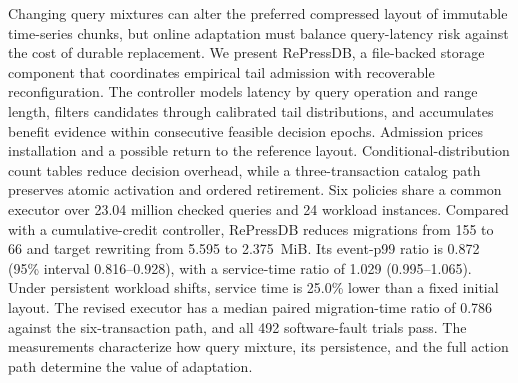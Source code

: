 Changing query mixtures can alter the preferred compressed layout of immutable time-series chunks, but online adaptation must balance query-latency risk against the cost of durable replacement. We present RePressDB, a file-backed storage component that coordinates empirical tail admission with recoverable reconfiguration. The controller models latency by query operation and range length, filters candidates through calibrated tail distributions, and accumulates benefit evidence within consecutive feasible decision epochs. Admission prices installation and a possible return to the reference layout. Conditional-distribution count tables reduce decision overhead, while a three-transaction catalog path preserves atomic activation and ordered retirement. Six policies share a common executor over 23.04 million checked queries and 24 workload instances. Compared with a cumulative-credit controller, RePressDB reduces migrations from 155 to 66 and target rewriting from 5.595 to 2.375~MiB. Its event-p99 ratio is 0.872 (95\% interval 0.816--0.928), with a service-time ratio of 1.029 (0.995--1.065). Under persistent workload shifts, service time is 25.0\% lower than a fixed initial layout. The revised executor has a median paired migration-time ratio of 0.786 against the six-transaction path, and all 492 software-fault trials pass. The measurements characterize how query mixture, its persistence, and the full action path determine the value of adaptation.
